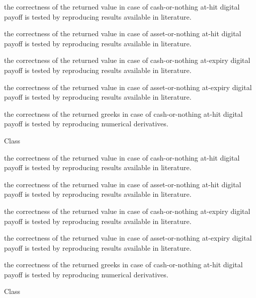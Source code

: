 \begin{DoxyRefList}
\begin{DoxyItemize}
\item the correctness of the returned value in case of cash-\/or-\/nothing at-\/hit digital payoff is tested by reproducing results available in literature.
\item the correctness of the returned value in case of asset-\/or-\/nothing at-\/hit digital payoff is tested by reproducing results available in literature.
\item the correctness of the returned value in case of cash-\/or-\/nothing at-\/expiry digital payoff is tested by reproducing results available in literature.
\item the correctness of the returned value in case of asset-\/or-\/nothing at-\/expiry digital payoff is tested by reproducing results available in literature.
\item the correctness of the returned greeks in case of cash-\/or-\/nothing at-\/hit digital payoff is tested by reproducing numerical derivatives. 
\end{DoxyItemize}
\item[Class \doxylink{class_quant_lib_1_1_analytic_digital_american_k_o_engine}{Quant\+Lib\+::Analytic\+Digital\+American\+KOEngine} ]\hfill \\
\label{test__test000138}%
%

\begin{DoxyItemize}
\item the correctness of the returned value in case of cash-\/or-\/nothing at-\/hit digital payoff is tested by reproducing results available in literature.
\item the correctness of the returned value in case of asset-\/or-\/nothing at-\/hit digital payoff is tested by reproducing results available in literature.
\item the correctness of the returned value in case of cash-\/or-\/nothing at-\/expiry digital payoff is tested by reproducing results available in literature.
\item the correctness of the returned value in case of asset-\/or-\/nothing at-\/expiry digital payoff is tested by reproducing results available in literature.
\item the correctness of the returned greeks in case of cash-\/or-\/nothing at-\/hit digital payoff is tested by reproducing numerical derivatives. 
\end{DoxyItemize}
\item[Class \doxylink{class_quant_lib_1_1_analytic_discrete_geometric_average_price_asian_engine}{Quant\+Lib\+::Analytic\+Discrete\+Geometric\+Average\+Price\+Asian\+Engine} ]\hfill \\
\label{test__test000094}%
%


\end{DoxyRefList}
